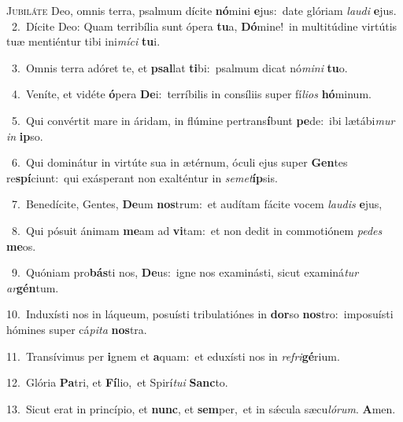 \lettrine{\initial\textcolor{\initialcolor}{J}}{ubiláte} Deo, omnis terra, psalmum dícite \textbf{nó}\-mini \textbf{e}\-jus:~\star date glóriam \textit{lau}\-\textit{di} \textbf{e}\-jus.\\
{\numbfont\textcolor{\numbcolor}{~2.}}~Dícite Deo: Quam terribília sunt ópera \textbf{tu}\-a, \textbf{Dó}\-mine!~\star in multitúdine virtútis tuæ mentiéntur tibi ini\-\textit{mí}\-\textit{ci} \textbf{tu}\-i.\par
{\numbfont\textcolor{\numbcolor}{~3.}}~Omnis terra adóret te, et \textbf{psal}\-lat \textbf{ti}\-bi:~\star psalmum dicat nó\-\textit{mi}\-\textit{ni} \textbf{tu}\-o.\par
{\numbfont\textcolor{\numbcolor}{~4.}}~Veníte, et vidéte \textbf{ó}\-pera \textbf{De}\-i:~\star terríbilis in consíliis super fí\-\textit{li}\-\textit{os} \textbf{hó}\-minum.\par
{\numbfont\textcolor{\numbcolor}{~5.}}~Qui convértit mare in áridam, in flúmine pertrans\-\textbf{í}\-bunt \textbf{pe}\-de:~\star ibi lætábi\textit{mur} \textit{in} \textbf{ip}\-so.\par
{\numbfont\textcolor{\numbcolor}{~6.}}~Qui dominátur in virtúte sua in ætérnum, óculi ejus super \textbf{Gen}\-tes re\-\textbf{spí}\-ciunt:~\star qui exásperant non exalténtur in \textit{se}\-\textit{met}\textbf{íp}sis.\par
{\numbfont\textcolor{\numbcolor}{~7.}}~Benedícite, Gentes, \textbf{De}\-um \textbf{nos}\-trum:~\star et audítam fácite vocem \textit{lau}\-\textit{dis} \textbf{e}\-jus,\par
{\numbfont\textcolor{\numbcolor}{~8.}}~Qui pósuit ánimam \textbf{me}\-am ad \textbf{vi}\-tam:~\star et non dedit in commotiónem \textit{pe}\-\textit{des} \textbf{me}\-os.\par
{\numbfont\textcolor{\numbcolor}{~9.}}~Quóniam pro\-\textbf{bás}\-ti nos, \textbf{De}\-us:~\star igne nos examinásti, sicut examiná\textit{tur} \textit{ar}\-\textbf{gén}tum.\par
{\numbfont\textcolor{\numbcolor}{10.}}~Induxísti nos in láqueum, posuísti tribulatiónes in \textbf{dor}\-so \textbf{nos}\-tro:~\star imposuísti hómines super cá\-\textit{pi}\-\textit{ta} \textbf{nos}\-tra.\par
{\numbfont\textcolor{\numbcolor}{11.}}~Transívimus per \textbf{i}\-gnem et \textbf{a}\-quam:~\star et eduxísti nos in \textit{re}\-\textit{fri}\textbf{gé}rium.\par
{\numbfont\textcolor{\numbcolor}{12.}}~Glória \textbf{Pa}\-tri, et \textbf{Fí}\-lio,~\star et Spirí\-\textit{tu}\-\textit{i} \textbf{Sanc}\-to.\par
{\numbfont\textcolor{\numbcolor}{13.}}~Sicut erat in princípio, et \textbf{nunc}\-, et \textbf{sem}\-per,~\star et in sǽcula sæcu\-\textit{ló}\-\textit{rum}. \textbf{A}\-men.\par

